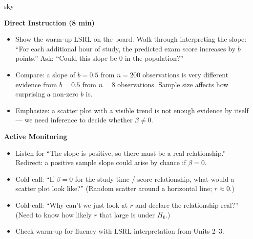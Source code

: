 \documentclass[10pt]{article}
\begin{document}
\begin{skillbox}{sky}
\begin{minipage}[t]{0.48\linewidth}
    \textbf{Direct Instruction (8 min)}
    \begin{itemize}
        \item Show the warm-up LSRL on the board. Walk through interpreting the slope:
              ``For each additional hour of study, the predicted exam score increases
              by $b$ points.'' Ask: ``Could this slope be 0 in the population?''
        \item Compare: a slope of $b = 0.5$ from $n = 200$ observations is very
              different evidence from $b = 0.5$ from $n = 8$ observations. Sample
              size affects how surprising a non-zero $b$ is.
        \item Emphasize: a scatter plot with a visible trend is not enough evidence by
              itself --- we need inference to decide whether $\beta \ne 0$.
    \end{itemize}
\end{minipage}
\hfill
\begin{minipage}[t]{0.48\linewidth}
    \textbf{Active Monitoring}
    \begin{itemize}
        \item Listen for ``The slope is positive, so there must be a real relationship.''
              Redirect: a positive sample slope could arise by chance if $\beta = 0$.
        \item Cold-call: ``If $\beta = 0$ for the study time / score relationship,
              what would a scatter plot look like?'' (Random scatter around a horizontal
              line; $r \approx 0$.)
        \item Cold-call: ``Why can't we just look at $r$ and declare the relationship
              real?'' (Need to know how likely $r$ that large is under $H_0$.)
        \item Check warm-up for fluency with LSRL interpretation from Units 2--3.
    \end{itemize}
\end{minipage}
\end{skillbox}
\end{document}
